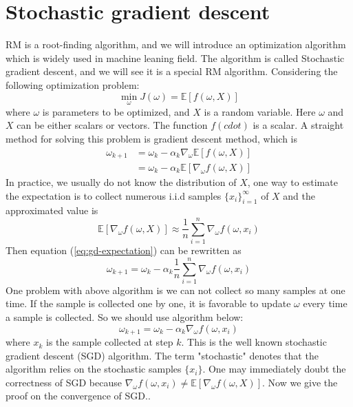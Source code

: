 \section{Stochastic gradient descent}

  RM is a root-finding algorithm, and we will introduce an optimization algorithm which is widely used in machine leaning
  field. The algorithm is called Stochastic gradient descent, and we will see it is a special RM algorithm. Considering
  the following optimization problem:
  \begin{equation*}
    \min_{\omega}J(\omega) = \mathbb{E}[f(\omega,X)]
  \end{equation*}
  where $\omega$ is parameters to be optimized, and $X$ is a random variable. Here $\omega$ and $X$ can be either scalars
  or vectors. The function $f( cdot)$ is a scalar. A straight method for solving this problem is gradient descent method,
  which is
  \begin{align}
    \label{eq:gd-expectation}
    \omega_{k+1} & = \omega_{k} - \alpha_{k} \nabla_{\omega}\mathbb{E}[f(\omega,X)] \\
                 & = \omega_{k} - \alpha_{k}\mathbb{E}[\nabla_{\omega}f(\omega,X)]
  \end{align}
  In practice, we usually do not know the distribution of $X$, one way to estimate the expectation is to collect numerous
  i.i.d samples $\{x_{i}\}_{i=1}^{\infty}$ of $X$ and the approximated value is
  \begin{equation*}
    \mathbb{E}[\nabla_{\omega}f(\omega,X)]\approx \frac{1}{n}\sum_{i=1}^{n}\nabla_{\omega}f(\omega,x_{i})
  \end{equation*}
  Then equation (\ref{eq:gd-expectation}) can be rewritten as
  \begin{equation*}
    \omega_{k+1} = \omega_{k} - \alpha_{k}\frac{1}{n}\sum_{i=1}^{n}\nabla_{\omega}f(\omega,x_{i})
  \end{equation*}
  One problem with above algorithm is we can not collect so many samples at one time. If the sample is collected one by
  one, it is favorable to update $\omega$ every time a sample is collected. So we should use algorithm below:
  \begin{equation}
    \label{eq:SGD}
    \omega_{k+1} = \omega_{k} - \alpha_{k}\nabla_{\omega}f(\omega,x_{i})
  \end{equation}
  where $x_{k}$ is the sample collected at step $k$. This is the well known stochastic gradient descent (SGD) algorithm.
  The term "stochastic" denotes that the algorithm relies on the stochastic samples $\{x_{i}\}$. One may immediately doubt
  the correctness of SGD because $\nabla_{\omega}f(\omega,x_{i}) \neq \mathbb{E}[\nabla_{\omega}f(\omega,X)]$. Now we give
  the proof on the convergence of SGD..

